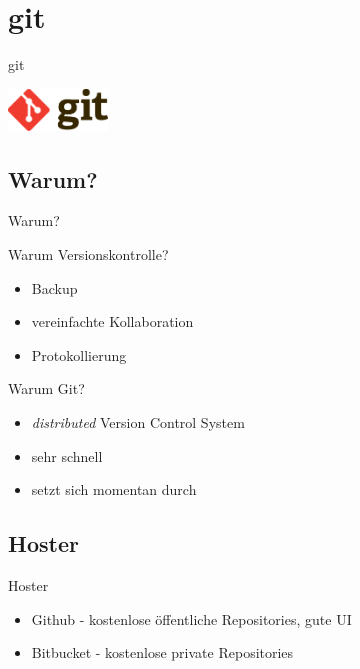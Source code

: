 \section{git}
\begin{frame}{git}
  \begin{center}
    \includegraphics[width=100px]{../Notes/img/git.pdf}
  \end{center}
  \tableofcontents[sectionstyle=show/hide,
                   subsectionstyle=show/show/hide,
                   subsubsectionstyle=show/show/show]
\end{frame}

\subsection{Warum?}
\begin{frame}{Warum?}
  \begin{block}{Warum Versionskontrolle?}
    \begin{itemize}
      \item Backup
      \item vereinfachte Kollaboration
      \item Protokollierung
    \end{itemize}
  \end{block}
  \begin{block}{Warum Git?}
    \begin{itemize}
      \item \textit{distributed} Version Control System
      \item sehr schnell
      \item setzt sich momentan durch
    \end{itemize}
  \end{block}
\end{frame}

\subsection{Hoster}
\begin{frame}{Hoster}
  \begin{itemize}
    \item Github - kostenlose öffentliche Repositories, gute UI
    \item Bitbucket - kostenlose private Repositories
  \end{itemize}
\end{frame}


